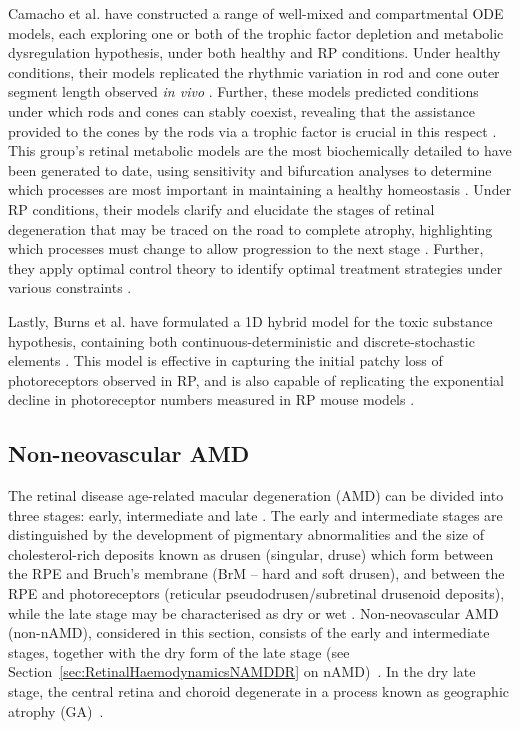 \documentclass{article}
\begin{document}
Camacho et al. have constructed a range of well-mixed and compartmental ODE models, each exploring one or both of the trophic factor depletion and metabolic dysregulation hypothesis, under both healthy and RP conditions. Under healthy conditions, their models replicated the rhythmic variation in rod and cone outer segment length observed \emph{in vivo} \citep{Camacho_et_al_2010,Camacho_et_al_2016b,Colon_Velez_et_al_2003, Wifvat_et_al_2021}. Further, these models predicted conditions under which rods and cones can stably coexist, revealing that the assistance provided to the cones by the rods via a trophic factor is crucial in this respect \citep{Camacho_et_al_2010,Camacho_et_al_2016b,Colon_Velez_et_al_2003, Wifvat_et_al_2021}. This group’s retinal metabolic models are the most biochemically detailed to have been generated to date, using sensitivity and bifurcation analyses to determine which processes are most important in maintaining a healthy homeostasis \citep{Aparicio_et_al_2022,Dobreva_et_al_2022,Camacho_et_al_2019,Camacho_et_al_2021a}. Under RP conditions, their models clarify and elucidate the stages of retinal degeneration that may be traced on the road to complete atrophy, highlighting which processes must change to allow progression to the next stage \citep{Camacho_and_Wirkus_2013,Camacho_et_al_2016,Camacho_et_al_2016c}. Further, they apply optimal control theory to identify optimal treatment strategies under various constraints \citep{Camacho_et_al_2014,Camacho_et_al_2020}.

Lastly, Burns et al. have formulated a 1D hybrid model for the toxic substance hypothesis, containing both continuous-deterministic and discrete-stochastic elements \citep{Burns_et_al_2002}. This model is effective in capturing the initial patchy loss of photoreceptors observed in RP, and is also capable of replicating the exponential decline in photoreceptor numbers measured in RP mouse models \citep{Clarke_et_al_2000}.
%
\subsection{Non-neovascular AMD}\label{Sec_non-nAMD}
%
The retinal disease age-related macular degeneration (AMD) can be divided into three stages: early, intermediate and late \citep{Ferris_et_al_2013}. The early and intermediate stages are distinguished by the development of pigmentary abnormalities and the size of cholesterol-rich deposits known as drusen (singular, druse) which form between the RPE and Bruch’s membrane (BrM – hard and soft drusen), and between the RPE and photoreceptors (reticular pseudodrusen/subretinal drusenoid deposits), while the late stage may be characterised as dry or wet \citep{Coleman_et_al_2008,Ferris_et_al_2013,Jager_2008,Wu_et_al_2022}. Non-neovascular AMD (non-nAMD), considered in this section, consists of the early and intermediate stages, together with the dry form of the late stage (see Section~\ref{sec:RetinalHaemodynamicsNAMDDR} on nAMD)~\cite{Ferris_et_al_2013}. In the dry late stage, the central retina and choroid degenerate in a process known as geographic atrophy (GA)~\cite{Coleman_et_al_2008,Jager_2008,Ly_et_al_2016}.
\end{document}
